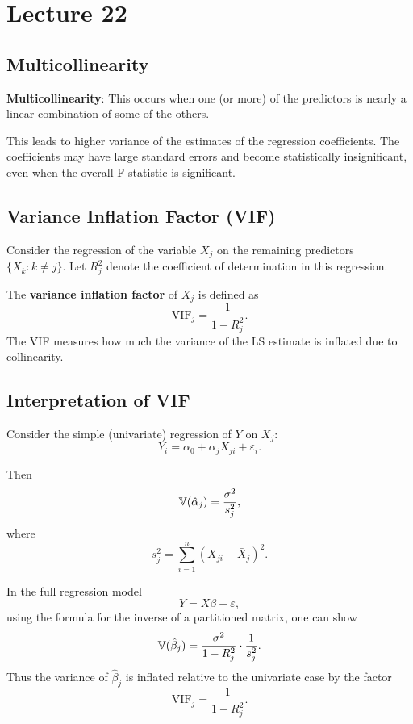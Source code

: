 \section{Lecture 22}

\subsection{Multicollinearity}

\begin{definition}
\textbf{Multicollinearity}: This occurs when one (or more) of the predictors is nearly a linear combination of some of the others.

This leads to higher variance of the estimates of the regression coefficients. The coefficients may have large standard errors and become statistically insignificant, even when the overall F-statistic is significant.
\end{definition}

\subsection{Variance Inflation Factor (VIF)}

\begin{definition}
Consider the regression of the variable $X_j$ on the remaining predictors $\{X_k : k \neq j\}$.  
Let $R_j^2$ denote the coefficient of determination in this regression.

The \textbf{variance inflation factor} of $X_j$ is defined as
\[
    \mathrm{VIF}_j = \frac{1}{1 - R_j^2}.
\]
The VIF measures how much the variance of the LS estimate is inflated due to collinearity.
\end{definition}

\subsection{Interpretation of VIF}

Consider the simple (univariate) regression of $Y$ on $X_j$:
\[
    Y_i = \alpha_0 + \alpha_j X_{ji} + \varepsilon_i.
\]

Then
\[
    \mathbb{V}(\hat{\alpha}_j) = \frac{\sigma^2}{s_j^2},
\]
where
\[
    s_j^2 = \sum_{i=1}^n (X_{ji} - \bar{X}_j)^2.
\]

\begin{result}
In the full regression model
\[
    Y = X \beta + \varepsilon,
\]
using the formula for the inverse of a partitioned matrix, one can show
\[
    \mathbb{V}(\hat{\beta}_j) = \frac{\sigma^2}{1 - R_j^2} \cdot \frac{1}{s_j^2}.
\]
Thus the variance of $\hat{\beta}_j$ is inflated relative to the univariate case by the factor
\[
    \mathrm{VIF}_j = \frac{1}{1 - R_j^2}.
\]
\end{result}


